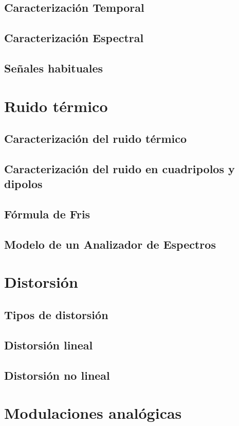 \documentclass[a4paper]{book}
\begin{document}
\section{Caracterización Temporal}
\section{Caracterización Espectral}
\section{Señales habituales}

\chapter{Ruido térmico}
\section{Caracterización del ruido térmico}
\section{Caracterización del ruido en cuadripolos y dipolos}
\section{Fórmula de Fris}
\section{Modelo de un Analizador de Espectros}

\chapter{Distorsión}
\section{Tipos de distorsión}
\section{Distorsión lineal}
\section{Distorsión no lineal}

\chapter{Modulaciones analógicas}
\end{document}
